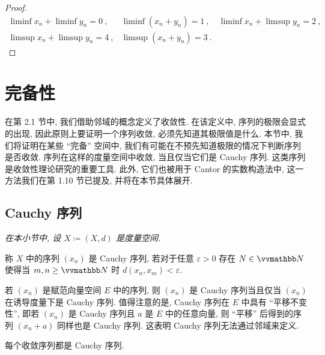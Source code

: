 \begin{proof}
    \[
        \begin{array}{lll}
            \liminf x_n + \liminf y_n = 0\ , & \liminf (x_n + y_n) = 1\ , & \liminf x_n + \limsup y_n = 2\ ,\\
            \limsup x_n + \limsup y_n = 4\ , & \limsup (x_n + y_n) = 3\ . &
        \end{array}
    \]
\end{proof}

\newpage

\section{完备性}

在第 2.1 节中, 我们借助邻域的概念定义了收敛性. 在该定义中, 序列的极限会显式的出现, 因此原则上要证明一个序列收敛, 必须先知道其极限值是什么. 本节中, 我们将证明在某些 ``完备'' 空间中, 我们有可能在不预先知道极限的情况下判断序列是否收敛. 序列在这样的度量空间中收敛, 当且仅当它们是 Cauchy 序列. 这类序列是收敛性理论研究的重要工具. 此外, 它们也被用于 Cantor 的实数构造法中, 这一方法我们在第 1.10 节已提及, 并将在本节具体展开.

\subsection{Cauchy 序列}

\begin{center}
    \textsl{在本小节中, 设 \(X \coloneqq (X, d)\) 是度量空间.}
\end{center}

\begin{definition}[Cauchy 序列]
    称 \(X\) 中的序列 \((x_n)\) 是 Cauchy 序列, 若对于任意 \(\varepsilon > 0\) 存在 \(N \in \N\) 使得当 \(m, n \geq \N\) 时 \(d(x_n, x_m) < \varepsilon\).
\end{definition}

若 \((x_n)\) 是赋范向量空间 \(E\) 中的序列, 则 \((x_n)\) 是 Cauchy 序列当且仅当 \((x_n)\) 在诱导度量下是 Cauchy 序列. 值得注意的是, Cauchy 序列在 \(E\) 中具有 ``平移不变性'', 即若 \((x_n)\) 是 Cauchy 序列且 \(a\) 是 \(E\) 中的任意向量, 则 ``平移'' 后得到的序列 \((x_n + a)\) 同样也是 Cauchy 序列. 这表明 Cauchy 序列无法通过邻域来定义.

\begin{proposition}\label{prop:convergent-sequence-is-cauchy-sequence}
    每个收敛序列都是 Cauchy 序列.
\end{proposition}

